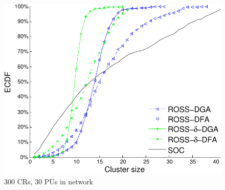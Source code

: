 \documentclass[times]{ettauth}
\theoremstyle{mytheoremstyle}
\theoremstyle{mytheoremstyle}
\theoremstyle{mytheoremstyle}
\begin{document}
\begin{figure}[t]
\begin{multicols}{3}
    \includegraphics[width=\linewidth]{cdf_clusterSize_300.pdf}\par\caption{300 CRs, 30 PUs in network}\label{cdf_clusterSize_300}
\end{multicols}
\end{figure}
\end{document}
